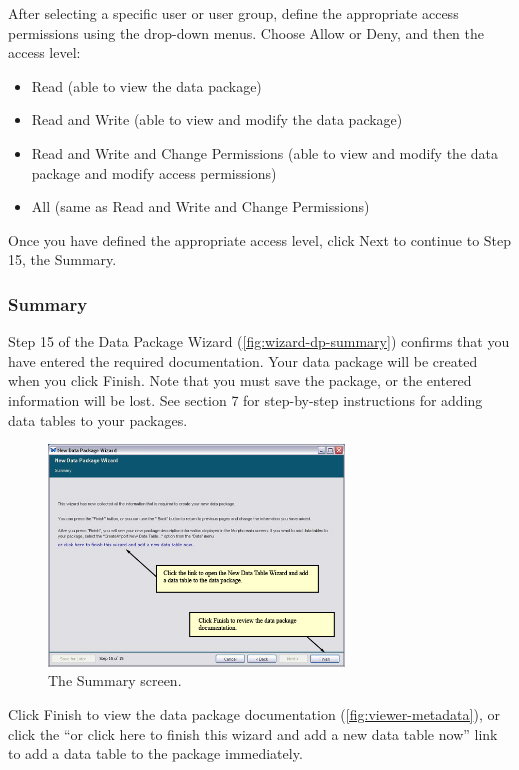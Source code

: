 After selecting a specific user or user group, define the appropriate
access permissions using the drop-down menus. Choose Allow or Deny, and
then the access level:
\begin{itemize}
  \setlength{\parskip}{1pt}
  \item Read (able to view the data package)
  \item Read and Write (able to view and modify the data package)
  \item Read and Write and Change Permissions (able to view and modify
    the data package and modify access permissions)
  \item All  (same as Read and Write and Change Permissions)
\end{itemize}

Once you have defined the appropriate access level, click Next to
continue to Step 15, the Summary.

\subsubsection{Summary} \label{sec:wizard-dp-summary}

Step 15 of the Data Package Wizard (\autoref{fig:wizard-dp-summary})
confirms that you have entered the required documentation. Your data
package will be created when you click Finish. Note that you must save
the package, or the entered information will be lost.  See section 7 for
step-by-step instructions for adding data tables to your packages.

\begin{figure}
  \centering
    \includegraphics[width=0.7\textwidth]{images/wizard-dp-summary.jpg}
  \caption{The Summary screen.}
  \label{fig:wizard-dp-summary}
\end{figure}

Click Finish to view the data package documentation
(\autoref{fig:viewer-metadata}), or click the ``or click here to finish
this wizard and add a new data table now'' link to add a data table to
the package immediately.

